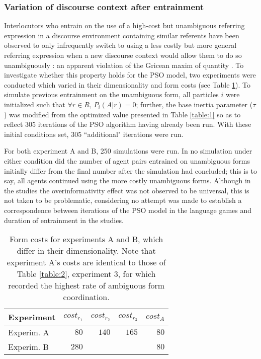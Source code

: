 \documentclass[a4paper,11pt]{article}
\begin{document}
\subsubsection{Variation of discourse context after entrainment}
Interlocutors who entrain on the use of a high-cost but unambiguous referring expression in a discourse environment containing similar referents have been observed to only infrequently switch to using a less costly but more general referring expression when a new discourse context would allow them to do so unambiguously \cite{brennan1996}: an apparent violation of the Gricean maxim of quantity \cite{grice1975}. To investigate whether this property holds for the PSO model, two experiments were conducted which varied in their dimensionality and form costs (see Table \ref{table:4}). To simulate previous entrainment on the unambiguous form, all particles $i$ were initialized such that $\forall r \in R,\, P_i(A|r) = 0$; further, the base inertia parameter ($\tau$) was modified from the optimized value presented in Table \ref{table:1} so as to reflect 305 iterations of the PSO algorithm having already been run. With these initial conditions set, 305 ``additional" iterations were run.

For both experiment A and B, 250 simulations were run. In no simulation under either condition did the number of agent pairs entrained on unambiguous forms initially differ from the final number after the simulation had concluded; this is to say, all agents continued using the more costly unambiguous forms. Although in the \citeauthor{brennan1996} studies the overinformativity effect was not observed to be universal, this is not taken to be problematic, considering no attempt was made to establish a correspondence between iterations of the PSO model in the \citeauthor{rohde2012} language games and duration of entrainment in the \citeauthor{brennan1996} studies. 

\begin{table}
\begin{center}
    \begin{tabular}{ l r r r r }
    Experiment & $cost_{r_1}$ & $cost_{r_2}$ & $cost_{r_3}$ & $cost_A$\\ \hline
    Experim. A & $80$  & $140$ & $165$ & $80$ \\ \hline
    Experim. B & $280$ &       &       & $80$ \\ \hline
    \end{tabular}
    \caption{Form costs for experiments A and B, which differ in their dimensionality. Note that experiment A's costs are identical to those of Table \ref{table:2}, experiment 3, for which \citeauthor{rohde2012} recorded the highest rate of ambiguous form coordination.}
    \label{table:4}
\end{center}
\end{table}
\end{document}
